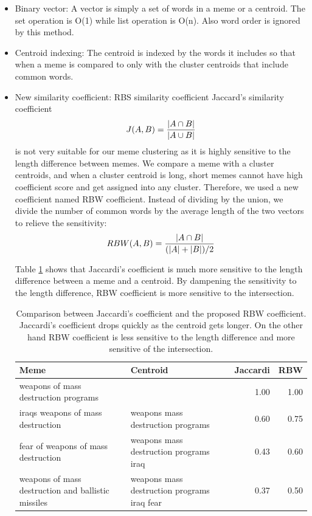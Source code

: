 \documentclass{sig-alternate}
\begin{document}
\begin{itemize}
 \item Binary vector: A vector is simply a set of words in a meme or a centroid. The set operation is O(1) while list operation is O(n). Also word order is ignored by this method.
 \item Centroid indexing: The centroid is indexed by the words it includes so that when a meme is compared to only with the cluster centroids that include common words.
 \item New similarity coefficient: RBS similarity coefficient
 Jaccard's similarity coefficient 
\begin{displaymath} 
 J(A,B) = {{|A \cap B|}\over{|A \cup B|}}
\end{displaymath} 
  is not very suitable for our meme clustering as it is highly sensitive to the length difference between memes. We compare a meme with a cluster centroids, and when a cluster centroid is long, short memes cannot have high coefficient score and get assigned into any cluster. Therefore, we used a new coefficient named RBW coefficient. Instead of dividing by the union, we divide the number of common words by the average length of the two vectors to relieve the sensitivity:\\
\begin{displaymath}
RBW(A, B) = {{|A \cap B|} \over {(|A|+|B|) / 2} }
\end{displaymath}

Table \ref{table:sim} shows that Jaccardi's coefficient is much more sensitive to the length difference between a meme and a centroid. By dampening the sensitivity to the length difference, RBW coefficient is more sensitive to the intersection. 

\begin{table}[h!t!]
\begin{center}
\begin{tabular}{p{3.0cm}|p{2.2cm}|r|r}
\hline
\textbf{Meme}&\textbf{Centroid}&\textbf{Jaccardi}&\textbf{RBW}\\
\hline
weapons of mass destruction programs&&1.00&1.00\\
\hline
iraqs weapons of mass destruction & weapons mass destruction programs&0.60&0.75\\
\hline
fear of weapons of mass destruction & weapons mass destruction programs iraq&0.43&0.60\\
\hline
weapons of mass destruction and ballistic missiles&weapons mass destruction programs iraq fear&0.37&0.50\\
\hline
\end{tabular}
\caption{Comparison between Jaccardi's coefficient and the proposed RBW coefficient. Jaccardi's coefficient drops quickly as the centroid gets longer. On the other hand RBW coefficient is less sensitive to the length difference and more sensitive of the intersection.}
\label{table:sim}
\end{center}
\end{table}


\end{itemize}
\end{document}
